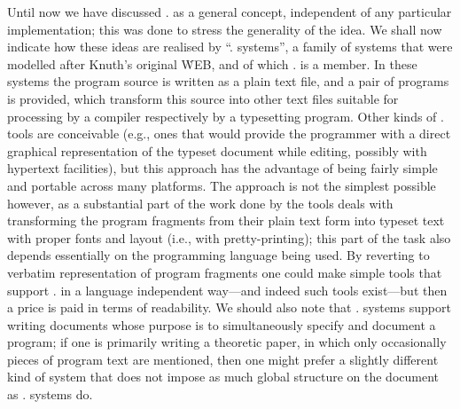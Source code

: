 Until now we have discussed \lp. as a general concept, independent of any
particular implementation; this was done to stress the generality of the
idea. We shall now indicate how these ideas are realised by ``\WEB.
systems'', a family of systems that were modelled after Knuth's original
\.{WEB}, and of which \CWEB. is a member. In these systems the program
source is written as a plain text file, and a pair of programs is provided,
which transform this source into other text files suitable for processing by
a compiler respectively by a typesetting program. Other kinds of \lp. tools
are conceivable (e.g., ones that would provide the programmer with a direct
graphical representation of the typeset document while editing, possibly
with hypertext facilities), but this approach has the advantage of being
fairly simple and portable across many platforms. The approach is not the
simplest possible however, as a substantial part of the work done by the
tools deals with transforming the program fragments from their plain text
form into typeset text with proper fonts and layout (i.e., with
pretty-printing); this part of the task also depends essentially on the
programming language being used. By reverting to verbatim representation of
program fragments one could make simple tools that support \lp. in a
language independent way---and indeed such tools exist---but then a price is
paid in terms of readability. We should also note that \WEB. systems support
writing documents whose purpose is to simultaneously specify and document a
program; if one is primarily writing a theoretic paper, in which only
occasionally pieces of program text are mentioned, then one might prefer a
slightly different kind of system that does not impose as much global
structure on the document as \WEB. systems do.

